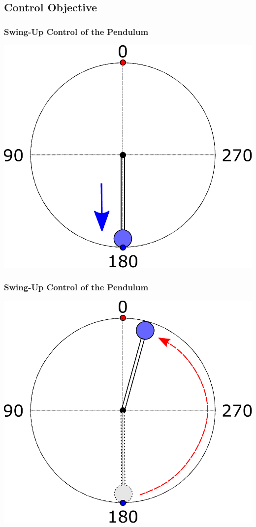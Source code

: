 \documentclass[]{beamer}
\begin{document}
\subsection{Control Objective}
\begin{frame}
  \frametitle{Swing-Up Control of the Pendulum}
  \centering 
  \includegraphics[scale=0.5]{images/OP2.pdf}
\end{frame}
\begin{frame}
	\frametitle{Swing-Up Control of the Pendulum}
	\centering 
	\includegraphics[scale=0.5]{images/OP3.pdf}
\end{frame}
\end{document}
